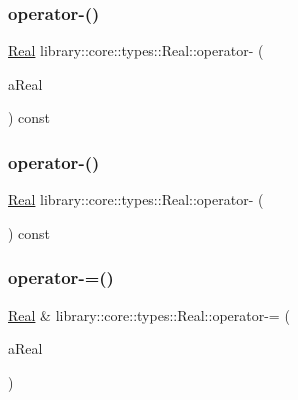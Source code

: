 \subsubsection{\texorpdfstring{operator-\/()}{operator-()}\hspace{0.1cm}{\footnotesize\ttfamily [2/3]}}
{\footnotesize\ttfamily \hyperlink{classlibrary_1_1core_1_1types_1_1_real}{Real} library\+::core\+::types\+::\+Real\+::operator-\/ (\begin{DoxyParamCaption}\item[{const \hyperlink{classlibrary_1_1core_1_1types_1_1_real_a9c5c8826b7e5a8e39544d23fea6c0e1c}{Real\+::\+Value\+Type} \&}]{a\+Real }\end{DoxyParamCaption}) const}

\mbox{\label{classlibrary_1_1core_1_1types_1_1_real_a7a018943c5110e4023f5e462eed70a25}} 
\subsubsection{\texorpdfstring{operator-\/()}{operator-()}\hspace{0.1cm}{\footnotesize\ttfamily [3/3]}}
{\footnotesize\ttfamily \hyperlink{classlibrary_1_1core_1_1types_1_1_real}{Real} library\+::core\+::types\+::\+Real\+::operator-\/ (\begin{DoxyParamCaption}{ }\end{DoxyParamCaption}) const}

\mbox{\label{classlibrary_1_1core_1_1types_1_1_real_a91b116698504125c3e9063e5b457f3fe}} 
\subsubsection{\texorpdfstring{operator-\/=()}{operator-=()}\hspace{0.1cm}{\footnotesize\ttfamily [1/2]}}
{\footnotesize\ttfamily \hyperlink{classlibrary_1_1core_1_1types_1_1_real}{Real} \& library\+::core\+::types\+::\+Real\+::operator-\/= (\begin{DoxyParamCaption}\item[{const \hyperlink{classlibrary_1_1core_1_1types_1_1_real}{Real} \&}]{a\+Real }\end{DoxyParamCaption})}

